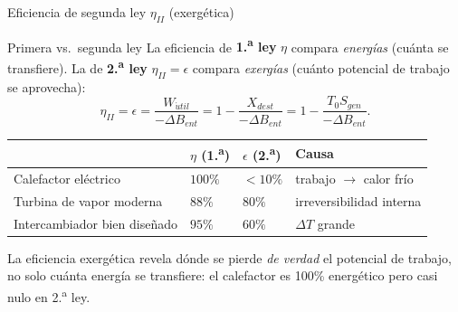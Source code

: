 \documentclass[aspectratio=169,10pt]{beamer}
\begin{document}
\begin{frame}{Eficiencia de segunda ley $\eta_{II}$ (exergética)}
\begin{cardidea}{Primera vs.\ segunda ley}{\faBalanceScale}
La eficiencia de \textbf{1.\textsuperscript{a} ley} $\eta$ compara \emph{energías} (cuánta se transfiere). La de \textbf{2.\textsuperscript{a} ley} $\eta_{II}=\epsilon$ compara \emph{exergías} (cuánto potencial de trabajo se aprovecha):
$$\eta_{II}=\epsilon=\frac{W_{\acute util}}{-\Delta B_{ent}}=1-\frac{X_{dest}}{-\Delta B_{ent}}=1-\frac{T_0S_{gen}}{-\Delta B_{ent}}.$$
\end{cardidea}
\vspace{1.4mm}
\begin{center}
{\footnotesize
\renewcommand{\arraystretch}{1.25}
\begin{tabular}{@{}>{\RaggedRight}p{5.4cm} >{\centering}p{2.3cm} >{\centering}p{2.3cm} >{\centering\arraybackslash}p{2.6cm}@{}}
\toprule
{\color{FondoOscuro}\bfseries Dispositivo} & {\color{FondoOscuro}\bfseries $\eta$ (1.\textsuperscript{a})} & {\color{FondoOscuro}\bfseries $\epsilon$ (2.\textsuperscript{a})} & {\color{FondoOscuro}\bfseries Causa}\\
\midrule
Calefactor eléctrico & $100\%$ & $<10\%$ & trabajo $\to$ calor frío\\
Turbina de vapor moderna & $88\%$ & $80\%$ & irreversibilidad interna\\
Intercambiador bien diseñado & $95\%$ & $60\%$ & $\Delta T$ grande\\
\bottomrule
\end{tabular}}
\end{center}
\vspace{0.8mm}
\begin{cardnota}[\faInfoCircle]
La eficiencia exergética revela dónde se pierde \emph{de verdad} el potencial de trabajo, no solo cuánta energía se transfiere: el calefactor es 100\% energético pero casi nulo en 2.\textsuperscript{a} ley.
\end{cardnota}
\end{frame}
\end{document}
